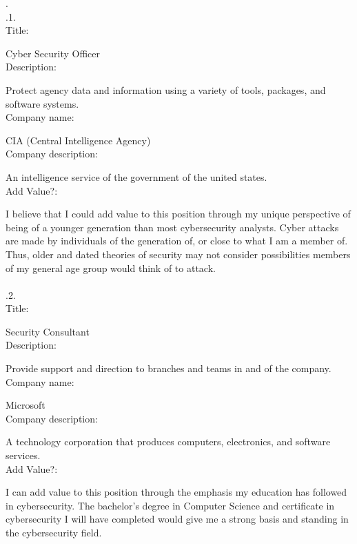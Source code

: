 \documentclass[12pt, a4paper]{article}
\begin{document}
.\\

.1.\\

Title: 

Cyber Security Officer \\

Description: 

Protect agency data and information using a variety of tools, packages, and software systems.\\

Company name: 

CIA (Central Intelligence Agency) \\

Company description: 

An intelligence service of the government of the united states.\\

Add Value?:

	I believe that I could add value to this position through my unique perspective of being of a younger generation than most cybersecurity analysts.  Cyber attacks are made by individuals of the generation of, or close to what I am a member of.  Thus, older and dated theories of security may not consider possibilities members of my general age group would think of to attack.\\ \\

.2.\\

Title: 

Security Consultant\\

Description: 

Provide support and direction to branches and teams in and of the company.  \\

Company name: 

Microsoft \\

Company description: 

A technology corporation that produces computers, electronics, and software services.\\

Add Value?:

	I can add value to this position through the emphasis my education has followed in cybersecurity.  The bachelor's degree in Computer Science and certificate in cybersecurity I will have completed would give me a strong basis and standing in the cybersecurity field. \\ \\
	
\end{document}
